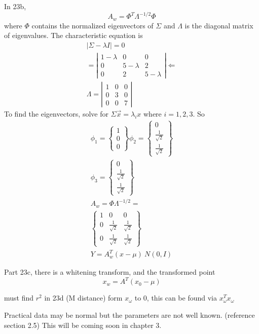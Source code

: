 \documentclass[11pt]{article}
\begin{document}
In 23b, 
\[
A_w = \Phi ^T \Lambda ^{-1/2}  \Phi
\]
where $\Phi$ contains the normalized eigenvectors of $\Sigma$ and $\Lambda$ is the diagonal matrix of eigenvalues.  The characteristic equation is 
\begin{eqnarray}
	| \Sigma - \lambda I | = 0 \\
	= 
		\left|
		\begin{array}{lll}
			1- \lambda & 0 & 0 \\
			0 & 5 - \lambda & 2 \\
			0 & 2 & 5 - \lambda 
		\end{array}
		\right| \Leftarrow \\
		\Lambda = 
		\left|
		\begin{array}{lll}
			1 & 0 & 0 \\
			0 & 3 & 0 \\
			0 & 0 & 7
		\end{array}
		\right|  
\end{eqnarray}
To find the eigenvectors, solve for $\Sigma \vec{x} = \lambda_i x $  where $i = 1,2,3$.  So
\begin{eqnarray}
\phi_1 = 	\left\{
	\begin{array}{l}
		1 \\
		0 \\
		0
	\end{array}
	\right\}	
\phi_2 =  	\left\{
	\begin{array}{l}
		0 \\
		\frac{1}{\sqrt{2}} \\
		\frac{1}{\sqrt{2}}
	\end{array}
	\right\}	\\
\phi_3 =  	\left\{
	\begin{array}{l}
		0 \\
		\frac{1}{\sqrt{2}} \\
		\frac{1}{\sqrt{2}} 
	\end{array}
	\right\} \\
A_w = \Phi \Lambda^{-1/2} = \\
\left\{
\begin{array}{lll}
	1 & 0 & 0  \\
	0 & \frac{1}{\sqrt{2}} & \frac{1}{\sqrt{2}} \\
	0 & \frac{1}{\sqrt{2}} & \frac{1}{\sqrt{2}} 
\end{array}
\right\} \\
Y = A^T _w (x - \mu) ~N(0,I) 
\end{eqnarray}


Part 23c, there is a whitening transform, and the transformed point 
\[
x_w = A^T (x_0 - \mu) 
\]

must find $r^2$ in 23d (M distance) form $x_\omega$ to $0$, this can be found via $x_\omega ^T x_\omega$


Practical data may be normal but the parameters are not well known.   (reference section 2.5) This will be coming soon in chapter 3.    
\end{document}
